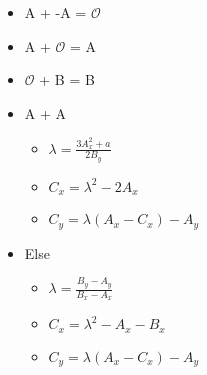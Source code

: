 \begin{itemize}
    \item[] A + -A = $\mathcal{O}$
    \item[] A + $\mathcal{O}$ = A
    \item[] $\mathcal{O}$ + B = B
    \item[] A + A
    \begin{itemize}
        \item[] $\lambda = \frac{3A_x^2 + a} {2B_y}$
        \item[] $C_x = \lambda^2 - 2A_x$
        \item[] $C_y = \lambda(A_x - C_x) - A_y$
    \end{itemize}
    \item[] Else
    \begin{itemize}
        \item[] $\lambda = \frac{B_y - A_y} {B_x - A_x}$
        \item[] $C_x = \lambda^2 - A_x - B_x$
        \item[] $C_y = \lambda(A_x - C_x) - A_y$
    \end{itemize}
\end{itemize}

